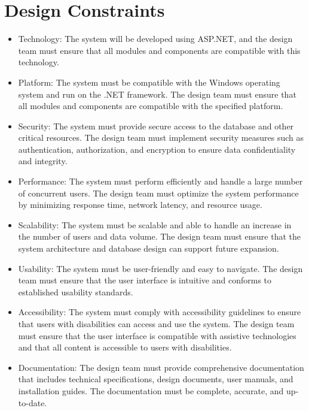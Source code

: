 \documentclass[12pt]{article}
\begin{document}
\section{Design Constraints}
\begin{itemize}
    \item Technology: The system will be developed using ASP.NET, and the design team must ensure that all modules and components are compatible with this technology.

    \item Platform: The system must be compatible with the Windows operating system and run on the .NET framework. The design team must ensure that all modules and components are compatible with the specified platform.

    \item Security: The system must provide secure access to the database and other critical resources. The design team must implement security measures such as authentication, authorization, and encryption to ensure data confidentiality and integrity.

    \item Performance: The system must perform efficiently and handle a large number of concurrent users. The design team must optimize the system performance by minimizing response time, network latency, and resource usage.

    \item Scalability: The system must be scalable and able to handle an increase in the number of users and data volume. The design team must ensure that the system architecture and database design can support future expansion.

    \item Usability: The system must be user-friendly and easy to navigate. The design team must ensure that the user interface is intuitive and conforms to established usability standards.

    \item Accessibility: The system must comply with accessibility guidelines to ensure that users with disabilities can access and use the system. The design team must ensure that the user interface is compatible with assistive technologies and that all content is accessible to users with disabilities.

    \item Documentation: The design team must provide comprehensive documentation that includes technical specifications, design documents, user manuals, and installation guides. The documentation must be complete, accurate, and up-to-date.
\end{itemize}
\end{document}
